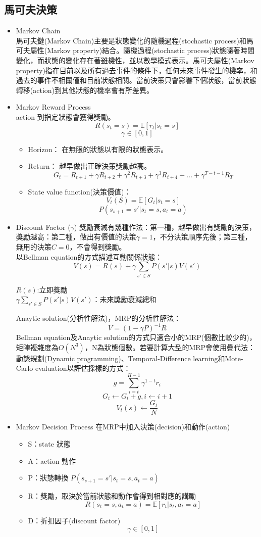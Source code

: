 \subsection{馬可夫決策}
\begin{itemize}
\item Markov Chain\\
 馬可夫鏈(Markov Chain)主要是狀態變化的隨機過程(stochastic process)和馬可夫屬性(Markov property)結合。隨機過程(stochastic process)狀態隨著時間變化，而狀態的變化存在著雖機性，並以數學模式表示。馬可夫屬性(Markov property)指在目前以及所有過去事件的條件下，任何未來事件發生的機率，和過去的事件不相關僅和目前狀態相關。當前決策只會影響下個狀態，當前狀態轉移(action)到其他狀態的機率會有所差異。\\
\item Markov Reward Process\\
action 到指定狀態會獲得獎勵。
$$R(s_t=s) = \mathbb{E}[r_t|s_t = s]$$
$$\gamma \in [0, 1]$$
\begin{itemize}
\item Horizon：
在無限的狀態以有限的狀態表示。
\item Return：
越早做出正確決策獎勵越高。
$$G_t = R_{t+1}+\gamma R_{t+2}+\gamma^2 R_{t+3}+\gamma^3 R_{t+4}+...+\gamma^{T-t-1} R_{T}$$
\item State value function(決策價值)：
$$V_t(S) = \mathbb{E}[G_t|s_t = s]$$
$$P(s_{s+1}=s'|s_t=s,a_t=a)$$
\end{itemize}
\item Discount Factor ($\gamma$)
獎勵衰減有幾種作法：第一種，越早做出有獎勵的決策，獎勵越高：第二種，做出有價值的決策$\gamma = 1$，不分決策順序先後；第三種，無用的決策$C = 0$，不會得到獎勵。\\
以Bellman equation的方式描述互動關係狀態：\\
$$V(s) = R(s)+\gamma\sum_{s'\in S}P(s'|s)V(s')$$
\begin{center}
$R(s)$:立即獎勵\\
$\gamma\sum_{s'\in S}P(s'|s)V(s')$：未來獎勵衰減總和
\end{center}
Anaytic solution(分析性解法)，MRP的分析性解法：
$$V = (1-\gamma P)^{-1}R$$
Bellman equation及Anaytic solution的方式只適合小的MRP(個數比較少的)，矩陣複雜度為$O(N^3)$，N為狀態個數。若要計算大型的MRP會使用疊代法：動態規劃(Dynamic programming)、Temporal-Difference learning和Mote-Carlo evaluation以評估採樣的方式：
$$g = \sum_{i=t}^{H-1}\gamma^{1-t}r_i$$
$$G_t \leftarrow G_t+g,  i \leftarrow i+1$$
$$V_t(s) \leftarrow \frac{G_t}{N}$$
\item Markov Decision Process
\quad 在MRP中加入決策(decision)和動作(action)
\begin{itemize}
\item S：state 狀態
\item A：action 動作
\item P：狀態轉換
$P(s_{s+1}=s'|s_t=s,a_t=a)$
\item R：獎勵，取決於當前狀態和動作會得到相對應的講勵
$$R(s_t=s, a_t=a) = \mathbb{E}[r_t|s_t, a_t=a]$$
\item D：折扣因子(discount factor)
$$\gamma \in [0,1]$$
\end{itemize}
\end{itemize}
